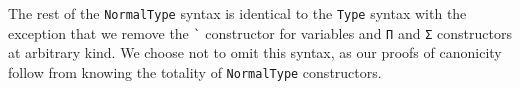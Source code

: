 \documentclass[authoryear, acmsmall, screen, review, nonacm]{acmart}
\begin{document}
The rest of the \verb!NormalType! syntax is identical to the \verb!Type! syntax with the exception that we remove the \verb!`! constructor for variables and \verb!Π! and \verb!Σ! constructors at arbitrary kind. We choose not to omit this syntax, as our proofs of canonicity follow from knowing the totality of \verb!NormalType! constructors.

\begin{code}%
%
\>[2]\<%
\\
%
\>[2]\AgdaSpace{}%
\AgdaSymbol{:}\<%
\\
\>[2][@{}l@{\AgdaIndent{0}}]%
\>[4]\AgdaSymbol{(}\AgdaSpace{}%
\AgdaSymbol{:}\AgdaSpace{}%
\AgdaSpace{}%
\AgdaSymbol{(}\AgdaSpace{}%
\AgdaOperator{\AgdaInductiveConstructor{,,}}\AgdaSpace{}%
\AgdaSymbol{)}\AgdaSpace{}%
\AgdaSymbol{)}\AgdaSpace{}%
\<%
\\
%
\>[4]\AgdaSpace{}%
\AgdaSpace{}%
\AgdaSymbol{(}\AgdaSpace{}%
\AgdaSpace{}%
\AgdaSymbol{)}\<%
\\
%
\\[\AgdaEmptyExtraSkip]%
%
\>[2]\AgdaSpace{}%
\AgdaSymbol{:}\<%
\\
\>[2][@{}l@{\AgdaIndent{0}}]%
\>[4]\AgdaSymbol{(}\AgdaSpace{}%
\AgdaSpace{}%
\AgdaSymbol{:}\AgdaSpace{}%
\AgdaSpace{}%
\AgdaSpace{}%
\AgdaSymbol{)}\AgdaSpace{}%
\<%
\\
%
\>[4]\AgdaSpace{}%
\AgdaSpace{}%
\<%
\\
%
\\[\AgdaEmptyExtraSkip]%
%
\>[2]%
\>[8]\AgdaSymbol{:}\<%
\\
\>[2][@{}l@{\AgdaIndent{0}}]%
\>[4]\AgdaSymbol{\{}\AgdaSpace{}%
\AgdaSymbol{:}\AgdaSpace{}%
\AgdaSymbol{\}}\AgdaSpace{}%
\AgdaSpace{}%
\AgdaSymbol{(}\AgdaSpace{}%
\AgdaSymbol{:}\AgdaSpace{}%
\AgdaSpace{}%
\AgdaSymbol{(}\AgdaSpace{}%
\AgdaOperator{\AgdaInductiveConstructor{,,}}\AgdaSpace{}%
\AgdaSymbol{)}\AgdaSpace{}%
\AgdaSymbol{)}\AgdaSpace{}%

\end{code}
\end{document}
